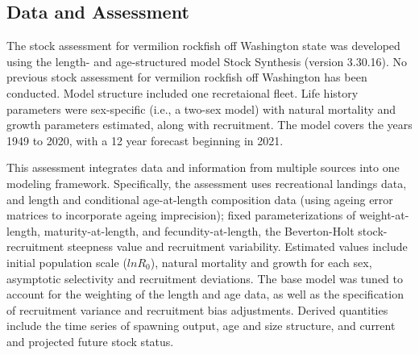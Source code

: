 \documentclass[11pt,
  english,
  a4paper,
]{article}
\begin{document}
\tagmcend\tagstructend

\clearpage


\hypertarget{data-and-assessment}{%
\subsection*{Data and Assessment}\label{data-and-assessment}}

\leavevmode\tagmcend\tagstructend


The stock assessment for vermilion rockfish off Washington state was developed using the length- and age-structured model Stock Synthesis (version 3.30.16). No previous stock assessment for vermilion rockfish off Washington has been conducted. Model structure included one recretaional fleet. Life history parameters were sex-specific (i.e., a two-sex model) with natural mortality and growth parameters estimated, along with recruitment. The model covers the years 1949 to 2020, with a 12 year forecast beginning in 2021.

\leavevmode\tagmcend\tagstructend\par


This assessment integrates data and information from multiple sources into one modeling framework. Specifically, the assessment uses recreational landings data, and length and conditional age-at-length composition data (using ageing error matrices to incorporate ageing imprecision); fixed parameterizations of weight-at-length, maturity-at-length, and fecundity-at-length, the Beverton-Holt stock-recruitment steepness value and recruitment variability. Estimated values include initial population scale ({\(lnR_0\)\leavevmode\tagmcend\tagstructend}), natural mortality and growth for each sex, asymptotic selectivity and recruitment deviations. The base model was tuned to account for the weighting of the length and age data, as well as the specification of recruitment variance and recruitment bias adjustments. Derived quantities include the time series of spawning output, age and size structure, and current and projected future stock status.

\leavevmode\tagmcend\tagstructend\par
\end{document}
